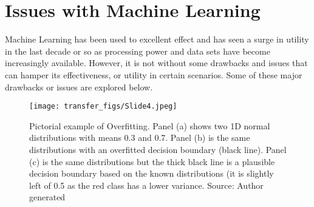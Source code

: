 \section{Issues with Machine Learning} Machine Learning has been used to excellent effect and has seen a surge in utility in the last decade or so as processing power and data sets have become increasingly available. However, it is not without some drawbacks and issues that can hamper its effectiveness, or utility in certain scenarios. Some of these major drawbacks or issues are explored below.

\begin{figure}
  \texttt{[image: transfer\_figs/Slide4.jpeg]}
  \caption[Pictorial example of Overfitting.]{Pictorial example of Overfitting. Panel (a) shows two 1D normal distributions with means 0.3 and 0.7. Panel (b) is the same distributions with an overfitted decision boundary (black line). Panel (c) is the same distributions but the thick black line is a plausible decision boundary based on the known distributions (it is slightly left of 0.5 as the red class has a lower variance. Source: Author generated}
  \label{fig:overfit}
\end{figure}



